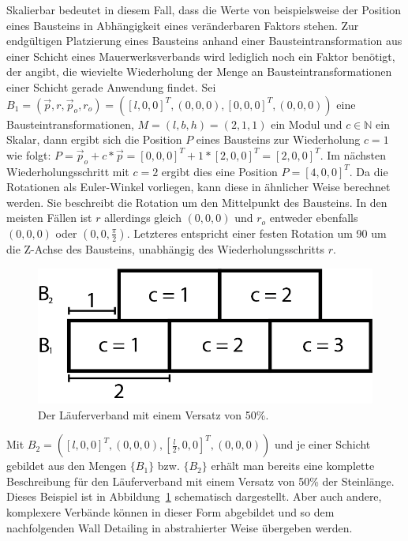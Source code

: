Skalierbar bedeutet in diesem Fall, dass die Werte von beispielsweise der Position eines Bausteins in Abhängigkeit eines veränderbaren Faktors stehen.
Zur endgültigen Platzierung eines Bausteins anhand einer Bausteintransformation aus einer Schicht eines Mauerwerksverbands wird lediglich noch ein Faktor benötigt, der angibt, die wievielte Wiederholung der Menge an Bausteintransformationen einer Schicht gerade Anwendung findet.
Sei \(B_1 = (\vec{p}, r, \vec{p}_o, r_o) = ({[l, 0, 0]}^T, (0, 0, 0), {[0, 0, 0]}^T, (0, 0, 0))\) eine Bausteintransformationen, \(M = (l, b, h) = (2, 1, 1)\) ein Modul und \(c\in\mathbb{N}\) ein Skalar,
dann ergibt sich die Position \(P\) eines Bausteins zur Wiederholung \(c = 1\) wie folgt: \(P = \vec{p}_o + c * \vec{p} = {[0, 0, 0]}^T + 1 * {[2, 0, 0]}^T = {[2, 0, 0]}^T\).
Im nächsten Wiederholungsschritt mit \(c = 2\) ergibt dies eine Position \(P = {[4, 0, 0]}^T\).
Da die Rotationen als Euler-Winkel vorliegen, kann diese in ähnlicher Weise berechnet werden.
Sie beschreibt die Rotation um den Mittelpunkt des Bausteins.
In den meisten Fällen ist \(r\) allerdings gleich \((0, 0, 0)\) und \(r_o\) entweder ebenfalls \((0, 0, 0)\) oder \((0, 0, \frac{\pi}{2})\).
Letzteres entspricht einer festen Rotation um 90\degree{} um die Z-Achse des Bausteins, unabhängig des Wiederholungsschritts \(r\).

\begin{figure}[hb!]
    \centering
    \includegraphics[width=0.7\columnwidth]{fig/concept_Mauerwerksverband.png}
    \caption{Der Läuferverband mit einem Versatz von 50\%.}
    \label{fig:concept:concept_Mauerwerksverband}
\end{figure}

Mit \(B_2 = ({[l, 0, 0]}^T, (0, 0, 0), {[\frac{l}{2}, 0, 0]}^T, (0, 0, 0))\) und je einer Schicht gebildet aus den Mengen \(\{B_1\}\) bzw. \(\{B_2\}\) erhält man bereits eine komplette Beschreibung für den Läuferverband mit einem Versatz von 50\% der Steinlänge.
Dieses Beispiel ist in Abbildung~\ref{fig:concept:concept_Mauerwerksverband} schematisch dargestellt.
Aber auch andere, komplexere Verbände können in dieser Form abgebildet und so dem nachfolgenden Wall Detailing in abstrahierter Weise übergeben werden.

